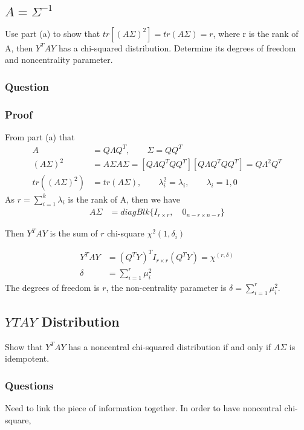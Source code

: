 \documentclass[11pt]{article} %
\begin{document}
\subsection{$A = \Sigma^{-1}$}

 Use part (a) to show that $tr[(A\Sigma)^2] = tr(A \Sigma) = r$, where r is the rank of
A, then $Y^TAY$ has a chi-squared distribution. Determine its degrees of freedom and noncentrality parameter.
\subsubsection{Question}

\subsubsection{Proof}
From part (a) that 
\begin{align*}
	A &= Q \Lambda Q^T, \qquad \Sigma = Q Q^T\\
	(A\Sigma)^2 &= A \Sigma A \Sigma =[Q \Lambda Q^T Q Q^T ] [Q \Lambda Q^T Q Q^T ] = Q \Lambda^2 Q^T\\
	tr((A\Sigma)^2) &= tr(A\Sigma), \qquad \lambda_i^2 = \lambda_i, \qquad \lambda_i = 1, 0
\end{align*}
As $r = \sum_{i=1}^k \lambda_i$ is the rank of A, then we have 
\begin{align*}
	A\Sigma &= diag Blk \{ I_{r \times r}, \quad 0_{n-r \times n-r}\}
\end{align*}

Then $Y^T A Y$ is the sum of $r$ chi-square $\chi^2(1, \delta_i)$

\begin{align*}
	Y^T A Y &=  (Q^T Y)^T I_{r \times r} (Q^T Y) = \chi^(r, \delta)\\
	\delta &= \sum_{i=1}^r \mu_i^2
\end{align*}
The degrees of freedom is $r$, the non-centrality parameter is $\delta = \sum_{i=1}^r \mu_i^2$.


\subsection{$Y TAY$ Distribution}
Show that $Y^T A Y$ has a noncentral chi-squared distribution if and only if $A \Sigma$ is idempotent.

\subsubsection{Questions}
Need to link the piece of information together. In order to have noncentral chi-square, 
\end{document}
